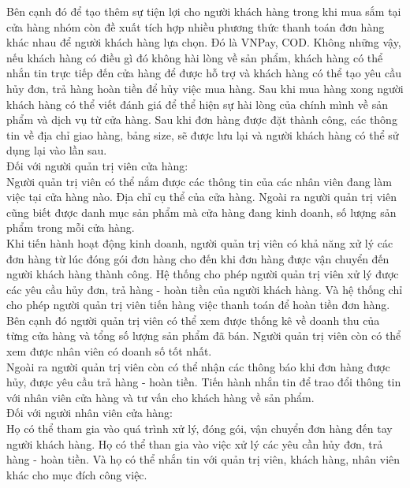Bên cạnh đó để tạo thêm sự tiện lợi cho người khách hàng trong khi mua sắm tại cửa hàng nhóm còn đề xuất tích hợp nhiều phương thức thanh toán đơn hàng khác nhau để người khách hàng lựa chọn. Đó là VNPay, COD. Không những vậy, nếu khách hàng có điều gì đó không hài lòng về sản phẩm, khách hàng có thể nhắn tin trực tiếp đến cửa hàng để được hỗ trợ và khách hàng có thể tạo yêu cầu hủy đơn, trả hàng hoàn tiền để hủy việc mua hàng. Sau khi mua hàng xong người khách hàng có thể viết đánh giá để thể hiện sự hài lòng của chính mình về sản phẩm và dịch vụ từ cửa hàng. Sau khi đơn hàng được đặt thành công, các thông tin về địa chỉ giao hàng, bảng size, sẽ được lưu lại và người khách hàng có thể sử dụng lại vào lần sau. \\

Đối với người quản trị viên cửa hàng: \\

Người quản trị viên có thể nắm được các thông tin của các nhân viên đang làm việc tại cửa hàng nào. Địa chỉ cụ thể của cửa hàng. Ngoài ra người quản trị viên cũng biết được danh mục sản phẩm mà cửa hàng đang kinh doanh, số lượng sản phẩm trong mỗi cửa hàng. \\

Khi tiến hành hoạt động kinh doanh, người quản trị viên có khả năng xử lý các đơn hàng từ lúc đóng gói đơn hàng cho đến khi đơn hàng được vận chuyển đến người khách hàng thành công. Hệ thống cho phép người quản trị viên xử lý được các yêu cầu hủy đơn, trả hàng - hoàn tiền của người khách hàng. Và hệ thống chỉ cho phép người quản trị viên tiến hàng việc thanh toán để hoàn tiền đơn hàng. \\

Bên cạnh đó người quản trị viên có thể xem được thống kê về doanh thu của từng cửa hàng và tổng số lượng sản phẩm đã bán. Người quản trị viên còn có thể xem được nhân viên có doanh số tốt nhất. \\

Ngoài ra người quản trị viên còn có thể nhận các thông báo khi đơn hàng được hủy, được yêu cầu trả hàng - hoàn tiền. Tiến hành nhắn tin để trao đổi thông tin với nhân viên cửa hàng và tư vấn cho khách hàng về sản phẩm. \\

Đối với người nhân viên cửa hàng: \\

Họ có thể tham gia vào quá trình xử lý, đóng gói, vận chuyển đơn hàng đến tay người khách hàng. Họ có thể than gia vào việc xử lý các yêu cần hủy đơn, trả hàng - hoàn tiền. Và họ có thể nhắn tin với quản trị viên, khách hàng, nhân viên khác cho mục đích công việc. \\


